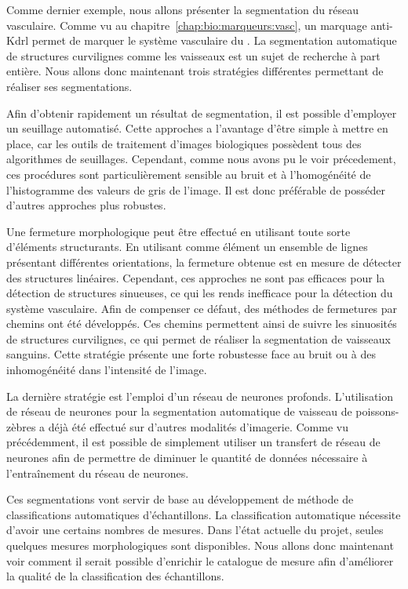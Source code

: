 \documentclass[\main/main.tex]{subfiles}
\begin{document}
%
Comme dernier exemple, nous allons présenter la segmentation du réseau vasculaire.
%
Comme vu au chapitre~\ref{chap:bio:marqueurs:vasc}, un marquage anti-Kdrl permet de marquer le système vasculaire du \pz{}.
%
La segmentation automatique de structures curvilignes comme les vaisseaux est un sujet de recherche à part entière.
%
Nous allons donc maintenant trois stratégies différentes permettant de réaliser ses segmentations.

%
Afin d'obtenir rapidement un résultat de segmentation, il est possible d'employer un seuillage automatisé\cite{kugler_2019}.
%
Cette approches a l'avantage d'être simple à mettre en place, car les outils de traitement d'images biologiques possèdent tous des algorithmes de seuillages.
%
Cependant, comme nous avons pu le voir précedement, ces procédures sont particulièrement sensible au bruit et à l'homogénéité de l'histogramme des valeurs de gris de l'image.
%
Il est donc préférable de posséder d'autres approches plus robustes.

%
Une fermeture morphologique peut être effectué en utilisant toute sorte d'éléments structurants.
%
En utilisant comme élément un ensemble de lignes présentant différentes orientations, 
la fermeture obtenue est en mesure de détecter des structures linéaires\cite{Soille_2001}.
%
Cependant, ces approches ne sont pas efficaces pour la détection de structures sinueuses, ce qui les rends inefficace pour la détection du système vasculaire.
%
Afin de compenser ce défaut, des méthodes de fermetures par chemins ont été développés\cite{talbot_2007,merveille_2018}.
%
Ces chemins permettent ainsi de suivre les sinuosités de structures curvilignes, ce qui permet de réaliser la segmentation de vaisseaux sanguins.
%
Cette stratégie présente une forte robustesse face au bruit ou à des inhomogénéité dans l'intensité de l'image.

%
La dernière stratégie est l'emploi d'un réseau de neurones profonds.
%
L'utilisation de réseau de neurones pour la segmentation automatique de vaisseau de poissons-zèbres a déjà été effectué sur d'autres modalités d'imagerie\cite{zhang_2019a, deaetwyler_2019}.
%
Comme vu précédemment, il est possible de simplement utiliser un transfert de réseau de neurones afin de permettre de diminuer le quantité de données nécessaire à l'entraînement du réseau de neurones.

%
Ces segmentations vont servir de base au développement de méthode de classifications automatiques d'échantillons.
%
La classification automatique nécessite d'avoir une certains nombres de mesures.
%
Dans l'état actuelle du projet, seules quelques mesures morphologiques sont disponibles.
%
Nous allons donc maintenant voir comment il serait possible d'enrichir le catalogue de mesure afin d'améliorer la qualité de la classification des échantillons.
\end{document}
